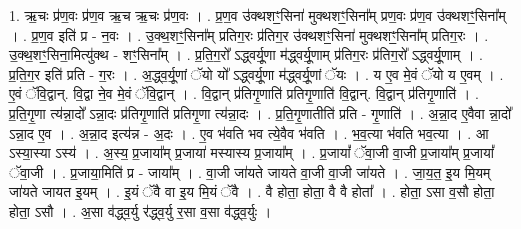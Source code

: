 \documentclass[17pt]{extarticle}
\begin{document}
1. ऋ॒चः प्र॑ण॒वः प्र॑ण॒व ऋ॒च ऋ॒चः प्र॑ण॒वः । . प्र॒ण॒व उ॑क्थशꣳ॒॒सिना॑ मुक्थशꣳ॒॒सिना᳚म् प्रण॒वः प्र॑ण॒व उ॑क्थशꣳ॒॒सिना᳚म् । . प्र॒ण॒व इति॑ प्र - न॒वः । . उ॒क्थ॒शꣳ॒॒सिना᳚म् प्रतिग॒रः प्र॑तिग॒र उ॑क्थशꣳ॒॒सिना॑ मुक्थशꣳ॒॒सिना᳚म् प्रतिग॒रः । . उ॒क्थ॒शꣳ॒॒सिना॒मित्यु॑क्थ - शꣳ॒॒सिना᳚म् । . प्र॒ति॒ग॒रो᳚ ऽद्ध्वर्यू॒णा म॑द्ध्वर्यू॒णाम् प्र॑तिग॒रः प्र॑तिग॒रो᳚ ऽद्ध्वर्यू॒णाम् । . प्र॒ति॒ग॒र इति॑ प्रति - ग॒रः । . अ॒द्ध्व॒र्यू॒णां ॅयो यो᳚ ऽद्ध्वर्यू॒णा म॑द्ध्वर्यू॒णां ॅयः । . य ए॒व मे॒वं ॅयो य ए॒वम् । . ए॒वं ॅवि॒द्वान्. वि॒द्वा ने॒व मे॒वं ॅवि॒द्वान् । . वि॒द्वान् प्र॑तिगृ॒णाति॑ प्रतिगृ॒णाति॑ वि॒द्वान्. वि॒द्वान् प्र॑तिगृ॒णाति॑ । . प्र॒ति॒गृ॒णा त्य॑न्ना॒दो᳚ ऽन्ना॒दः प्र॑तिगृ॒णाति॑ प्रतिगृ॒णा त्य॑न्ना॒दः । . प्र॒ति॒गृ॒णातीति॑ प्रति - गृ॒णाति॑ । . अ॒न्ना॒द ए॒वैवा न्ना॒दो᳚ ऽन्ना॒द ए॒व । . अ॒न्ना॒द इत्य॑न्न - अ॒दः । . ए॒व भ॑वति भव त्ये॒वैव भ॑वति । . भ॒व॒त्या भ॑वति भव॒त्या । . आ ऽस्या॒स्या ऽस्य॑ । . अ॒स्य॒ प्र॒जाया᳚म् प्र॒जाया॑ मस्यास्य प्र॒जाया᳚म् । . प्र॒जायां᳚ ॅवा॒जी वा॒जी प्र॒जाया᳚म् प्र॒जायां᳚ ॅवा॒जी । . प्र॒जाया॒मिति॑ प्र - जाया᳚म् । . वा॒जी जा॑यते जायते वा॒जी वा॒जी जा॑यते । . जा॒य॒त॒ इ॒य मि॒यम् जा॑यते जायत इ॒यम् । . इ॒यं ॅवै वा इ॒य मि॒यं ॅवै । . वै होता॒ होता॒ वै वै होता᳚ । . होता॒ ऽसा व॒सौ होता॒ होता॒ ऽसौ । . अ॒सा व॑द्ध्व॒र्यु र॑द्ध्व॒र्यु र॒सा व॒सा व॑द्ध्व॒र्युः । \newline
\end{document}
